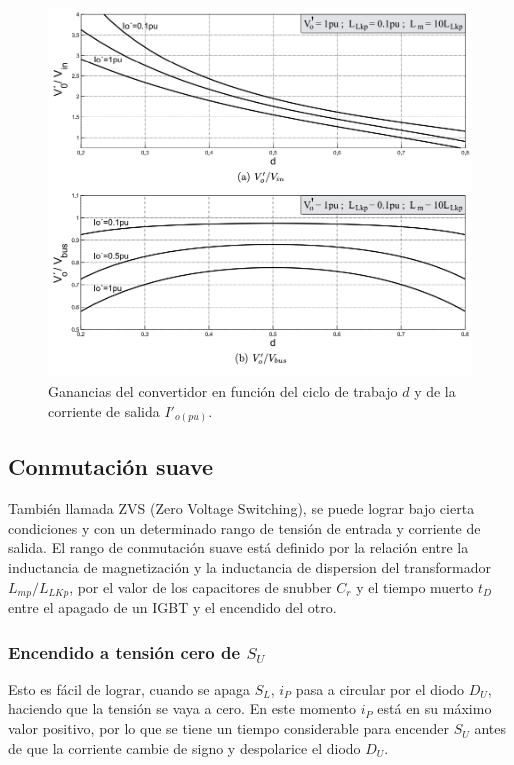 \begin{figure}
	\centering
	\includegraphics[width=0.9\linewidth]{img/eqI}
	\caption{Ganancias del convertidor en función del ciclo de trabajo $d$ y de la corriente de salida $I'_{o(pu)}$.}
	\label{fig:eqi}
\end{figure}


\subsection{Conmutación suave}

También llamada ZVS (Zero Voltage Switching), se puede lograr bajo cierta condiciones y con un determinado rango de tensión de entrada y corriente de salida. El rango de conmutación suave está definido por la relación entre la inductancia de magnetización y la inductancia de dispersion del transformador $L_{mp}/L_{LKp}$, por el valor de los capacitores de snubber $C_r$ y el tiempo muerto $t_D$ entre el apagado de un IGBT y el encendido del otro.

\subsubsection{Encendido a tensión cero de $S_U$}

Esto es fácil de lograr, cuando se apaga $S_L$, $i_P$ pasa a circular por el diodo $D_U$, haciendo que la tensión se vaya a cero. En este momento $i_P$ está en su máximo valor positivo, por lo que se tiene un tiempo considerable para encender $S_U$ antes de que la corriente cambie de signo y despolarice el diodo $D_U$.

